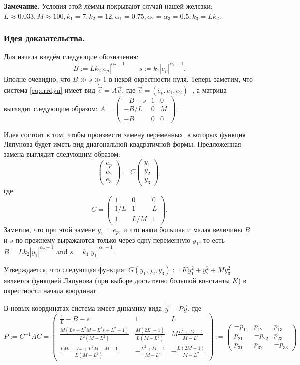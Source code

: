 \documentclass{article}
\begin{document}
{\bf Замечание.} Условия этой леммы покрывают случай нашей железки: $L\approx 0.033, M\approx100, k_1=7, k_2=12, \alpha_1=0.75, \alpha_2=\alpha_3=0.5, k_3=Lk_2 $.

\subsubsection{Идея доказательства.}

Для начала введём следующие обозначения:
$$
B := Lk_2|e_p|^{\alpha_2-1} \qquad  s:=k_1|e_p|^{\alpha_1-1}.
$$
Вполне очевидно, что $B \gg s \gg 1$ в некой окрестности нуля.
Теперь заметим, что система \eqref{eq:errdyn} имеет вид $\dot{\vec{e}} = A\vec{e}$, где $\vec{e} = (e_p, e_1, e_2)^\top$, а матрица выглядит следующим образом:
$A=\begin{pmatrix}-B-s&1&0\\-B/L&0&M\\-B&0&0\end{pmatrix}$.

Идея состоит в том, чтобы произвести замену переменных, в которых функция Ляпунова будет иметь вид диагональной квадратичной формы.
Предложенная замена выглядит следующим образом:
$$
\begin{pmatrix} e_p\\e_2\\e_3
\end{pmatrix}=C
\begin{pmatrix} y_1\\y_2\\y_3
\end{pmatrix},
$$
где 
$$
C=\begin{pmatrix}1&0&0\\1/L&1&L\\1&L/M&1 \end{pmatrix}.
$$
Заметим, что при этой замене $y_1=e_p$, и что наши большая и малая величины $B$ и $s$ по-прежнему выражаются только через одну переменную $y_1$, то есть
$B=Lk_2|y_1|^{\alpha_2-1}$ and $s=k_1|y_1|^{\alpha_1-1}$.

Утверждается, что следующая функция:
$G(y_1,y_2,y_3):=K y_1^2+ y_2^2 + M y_3^2$ является функцией Ляпунова (при выборе достаточно большой константы $K$) в окрестности начала координат.



В новых координатах система имеет динамику вида $\dot{\vec{y}} = P\vec{y}$, где
$$
 P  := C^{-1}AC=
 \begin{pmatrix}
 \frac1L-B-s&1&L
 \\[1mm]
\frac{M(Ls+L^2M-L^3s+L^2-1)}{L^2(M-L^2)}&\frac{M(2L^2-1)}{L(M-L^2)} &M\frac{L^2 + M - 1}{M-L^2}
 \\[1mm]
\frac{  LMs-Ls+L^2M-M+1}{L(M-L^2)}&-\frac{L^2 + M - 1}{M-L^2}&-\frac{L(2M-1)}{M-L^2} \end{pmatrix}
:= \begin{pmatrix}-p_{11}&p_{12}&p_{13}\\p_{21}&-p_{22}&p_{23}\\p_{31}&p_{32}&-p_{33}\end{pmatrix}
$$
\end{document}
